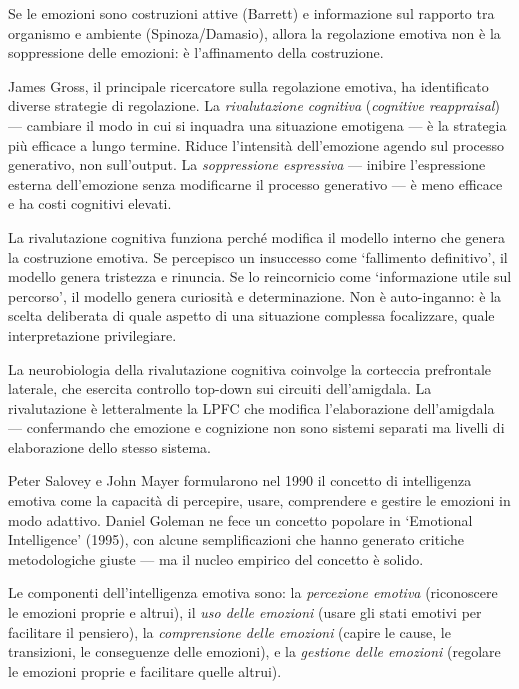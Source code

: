 \documentclass[12pt,a4paper,openany]{book}
\newcommand{\sezione}[1]{\vspace{1.2em}{\large\bfseries #1}\vspace{0.5em}\par}
\begin{document}
Se le emozioni sono costruzioni attive (Barrett) e informazione sul rapporto tra organismo e ambiente (Spinoza/Damasio), allora la regolazione emotiva non è la soppressione delle emozioni: è l'affinamento della costruzione.

James Gross, il principale ricercatore sulla regolazione emotiva, ha identificato diverse strategie di regolazione. La \textit{rivalutazione cognitiva} (\textit{cognitive reappraisal}) --- cambiare il modo in cui si inquadra una situazione emotigena --- è la strategia più efficace a lungo termine. Riduce l'intensità dell'emozione agendo sul processo generativo, non sull'output. La \textit{soppressione espressiva} --- inibire l'espressione esterna dell'emozione senza modificarne il processo generativo --- è meno efficace e ha costi cognitivi elevati.

La rivalutazione cognitiva funziona perché modifica il modello interno che genera la costruzione emotiva. Se percepisco un insuccesso come `fallimento definitivo', il modello genera tristezza e rinuncia. Se lo reincornicio come `informazione utile sul percorso', il modello genera curiosità e determinazione. Non è auto-inganno: è la scelta deliberata di quale aspetto di una situazione complessa focalizzare, quale interpretazione privilegiare.

La neurobiologia della rivalutazione cognitiva coinvolge la corteccia prefrontale laterale, che esercita controllo top-down sui circuiti dell'amigdala. La rivalutazione è letteralmente la LPFC che modifica l'elaborazione dell'amigdala --- confermando che emozione e cognizione non sono sistemi separati ma livelli di elaborazione dello stesso sistema.

\sezione{L'intelligenza emotiva come competenza acquisibile}

Peter Salovey e John Mayer formularono nel 1990 il concetto di intelligenza emotiva come la capacità di percepire, usare, comprendere e gestire le emozioni in modo adattivo. Daniel Goleman ne fece un concetto popolare in `Emotional Intelligence' (1995), con alcune semplificazioni che hanno generato critiche metodologiche giuste --- ma il nucleo empirico del concetto è solido.

Le componenti dell'intelligenza emotiva sono: la \textit{percezione emotiva} (riconoscere le emozioni proprie e altrui), il \textit{uso delle emozioni} (usare gli stati emotivi per facilitare il pensiero), la \textit{comprensione delle emozioni} (capire le cause, le transizioni, le conseguenze delle emozioni), e la \textit{gestione delle emozioni} (regolare le emozioni proprie e facilitare quelle altrui).
\end{document}
